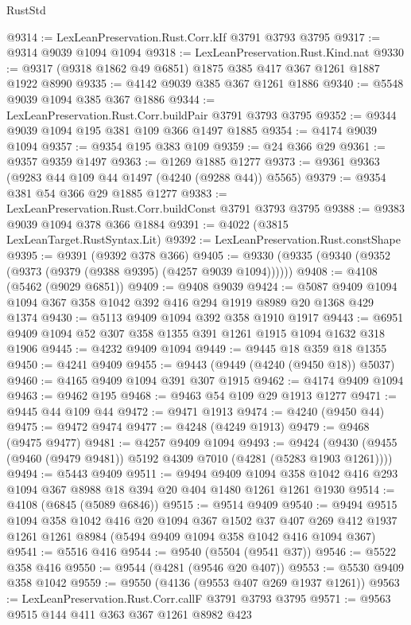 \begin{lexlean}{RustStd}
\begin{coremodule}
{\begin{coremodule}
{{{{{{{{{{{{{{{{{{{{{{{{{{{{{{{{{{{@9314 := LexLeanPreservation.Rust.Corr.kIf @3791 @3793 @3795
@9317 := @9314 @9039 @1094 @1094
@9318 := LexLeanPreservation.Rust.Kind.nat
@9330 := @9317 (@9318 @1862 @49 @6851) @1875 @385 @417 @367 @1261 @1887 @1922 @8990
@9335 := @4142 @9039 @385 @367 @1261 @1886
@9340 := @5548 @9039 @1094 @385 @367 @1886
@9344 := LexLeanPreservation.Rust.Corr.buildPair @3791 @3793 @3795
@9352 := @9344 @9039 @1094 @195 @381 @109 @366 @1497 @1885
@9354 := @4174 @9039 @1094
@9357 := @9354 @195 @383 @109
@9359 := @24 @366 @29
@9361 := @9357 @9359 @1497
@9363 := @1269 @1885 @1277
@9373 := @9361 @9363 (@9283 @44 @109 @44 @1497 (@4240 (@9288 @44)) @5565)
@9379 := @9354 @381 @54 @366 @29 @1885 @1277
@9383 := LexLeanPreservation.Rust.Corr.buildConst @3791 @3793 @3795
@9388 := @9383 @9039 @1094 @378 @366 @1884
@9391 := @4022 (@3815 LexLeanTarget.RustSyntax.Lit)
@9392 := LexLeanPreservation.Rust.constShape
@9395 := @9391 (@9392 @378 @366)
@9405 := @9330 (@9335 (@9340 (@9352 (@9373 (@9379 (@9388 @9395) (@4257 @9039 @1094))))))
@9408 := @4108 (@5462 (@9029 @6851))
@9409 := @9408 @9039
@9424 := @5087 @9409 @1094 @1094 @367 @358 @1042 @392 @416 @294 @1919 @8989 @20 @1368 @429 @1374
@9430 := @5113 @9409 @1094 @392 @358 @1910 @1917
@9443 := @6951 @9409 @1094 @52 @307 @358 @1355 @391 @1261 @1915 @1094 @1632 @318 @1906
@9445 := @4232 @9409 @1094
@9449 := @9445 @18 @359 @18 @1355
@9450 := @4241 @9409
@9455 := @9443 (@9449 (@4240 (@9450 @18)) @5037)
@9460 := @4165 @9409 @1094 @391 @307 @1915
@9462 := @4174 @9409 @1094
@9463 := @9462 @195
@9468 := @9463 @54 @109 @29 @1913 @1277
@9471 := @9445 @44 @109 @44
@9472 := @9471 @1913
@9474 := @4240 (@9450 @44)
@9475 := @9472 @9474
@9477 := @4248 (@4249 @1913)
@9479 := @9468 (@9475 @9477)
@9481 := @4257 @9409 @1094
@9493 := @9424 (@9430 (@9455 (@9460 (@9479 @9481)) @5192 @4309 @7010 (@4281 (@5283 @1903 @1261))))
@9494 := @5443 @9409
@9511 := @9494
    @9409
    @1094
    @358
    @1042
    @416
    @293
    @1094
    @367
    @8988
    @18
    @394
    @20
    @404
    @1480
    @1261
    @1261
    @1930
@9514 := @4108 (@6845 (@5089 @6846))
@9515 := @9514 @9409
@9540 := @9494
    @9515
    @1094
    @358
    @1042
    @416
    @20
    @1094
    @367
    @1502
    @37
    @407
    @269
    @412
    @1937
    @1261
    @1261
    @8984
    (@5494 @9409 @1094 @358 @1042 @416 @1094 @367)
@9541 := @5516 @416
@9544 := @9540 (@5504 (@9541 @37))
@9546 := @5522 @358 @416
@9550 := @9544 (@4281 (@9546 @20 @407))
@9553 := @5530 @9409 @358 @1042
@9559 := @9550 (@4136 (@9553 @407 @269 @1937 @1261))
@9563 := LexLeanPreservation.Rust.Corr.callF @3791 @3793 @3795
@9571 := @9563 @9515 @144 @411 @363 @367 @1261 @8982 @423
}}}}}}}}}}}}}}}}}}}}}}}}}}}}}}}}}}}
\end{coremodule}}
\end{coremodule}
\end{lexlean}
